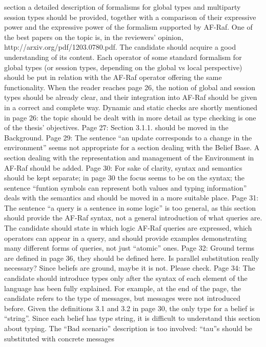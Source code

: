 \documentclass{article}
\newenvironment{them}{\noindent\begingroup\color{blue}}{\endgroup\par}
\begin{document}
\begin{them}
section a detailed description of formalisms for global types and multiparty session types should be
provided, together with a comparison of their expressive power and the expressive power of the
formalism supported by AF-Raf. One of the best papers on the topic is, in the reviewers' opinion,
http://arxiv.org/pdf/1203.0780.pdf. The candidate should acquire a good understanding of its
content. Each operator of some standard formalism for global types (or session types, depending on
the global vs local perspective) should be put in relation with the AF-Raf operator offering the same
functionality. When the reader reaches page 26, the notion of global and session types should be
already clear, and their integration into AF-Raf should be given in a correct and complete way.
Dynamic and static checks are shortly mentioned in page 26: the topic should be dealt with in more
detail as type checking is one of the thesis' objectives.
Page 27:
Section 3.1.1. should be moved in the Background.
Page 29:
The sentence “an update corresponds to a change in the environment” seems not appropriate for a
section dealing with the Belief Base. A section dealing with the representation and management of
the Environment in AF-Raf should be added.
Page 30:
For sake of clarity, syntax and semantics should be kept separate; in page 30 the focus seems to be
on the syntax; the sentence “funtion symbols can represent both values and typing information”
deals with the semantics and should be moved in a more suitable place.
Page 31:
The sentence “a query is a sentence in some logic” is too general, as this section should provide the
AF-Raf syntax, not a general introduction of what queries are. The candidate should state in which
logic AF-Raf queries are expressed, which operators can appear in a query, and should provide
examples demonstrating many different forms of queries, not just “atomic” ones.
Page 32:
Ground terms are defined in page 36, they should be defined here.
Is parallel substitution really necessary? Since beliefs are ground, maybe it is not. Please check.
Page 34:
The candidate should introduce types only after the syntax of each element of the language has been
fully explained. For example, at the end of the page, the candidate refers to the type of messages,
but messages were not introduced before.
Given the definitions 3.1 and 3.2 in page 30, the only type for a belief is “string”. Since each belief has
type string, it is difficult to understand this section about typing.
The “Bad scenario” description is too involved: “tau”s should be substituted with concrete messages

\end{them}
\end{document}
